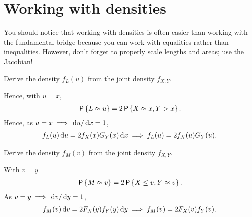 \documentclass[a4paper,11pt]{article}
\begin{document}
\section{Working with densities}
\label{sec:work-with-dens}
You should notice that working with densities is often easier than working with the fundamental bridge because you can work with equalities rather than inequalities.
However, don't forget to properly scale lengths and areas; use the Jacobian!


\begin{exercise}
Derive the density $f_L(u)$ from the joint density $f_{X,Y}$.
\begin{solution}
Hence, with $u=x$,
\begin{align}
\P{L \approx u} = 2 \P{X \approx x, Y > x}. 
\end{align}
Hence, as $u=x \implies \d u/\d x = 1$, 
\begin{align*}
  f_{L}(u) \d u = 2f_{X}(x) G_{Y}(x) \d x \implies   f_{L}(u)  = 2f_{X}(u) G_{Y}(u).
\end{align*}
\end{solution}
\end{exercise}

\begin{exercise}\label{ex:6}
Derive the density $f_M(v)$ from the joint density $f_{X,Y}$.
\begin{solution}
With $v=y$
\begin{align}
\P{M \approx v} = 2 \P{X \leq v, Y \approx v}. 
\end{align}
As $v=y \implies \d v/\d y = 1$, 
\begin{align}
f_M(v) \d v =  2F_{X}(y) f_{Y}(y)\d y \implies f_M(v) =  2F_{X}(v) f_{Y}(v).
\end{align}
\end{solution}
\end{exercise}
\end{document}
